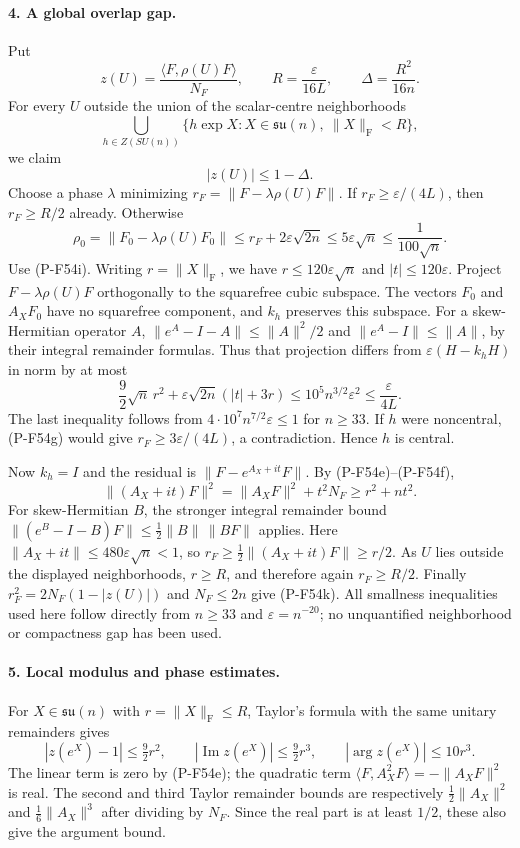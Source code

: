 \documentclass[11pt,a4paper]{article}
\begin{document}
\paragraph{4. A global overlap gap.}
Put
\[
 z(U)=\frac{\langle F,\rho(U)F\rangle}{N_F},
 \qquad R=\frac{\varepsilon}{16L},
 \qquad \Delta=\frac{R^2}{16n}.
                                                               \tag{P-F54j}
\]
For every $U$ outside the union of the scalar-centre neighborhoods
\[
  \bigcup_{h\in Z(SU(n))}
       \{h\exp X:X\in\mathfrak{su}(n),\ \|X\|_{\mathrm F}<R\},
\]
we claim
\[
                            |z(U)|\le1-\Delta.               \tag{P-F54k}
\]
Choose a phase $\lambda$ minimizing
$r_F=\|F-\lambda\rho(U)F\|$.
If $r_F\ge\varepsilon/(4L)$, then $r_F\ge R/2$ already.
Otherwise
\[
 \rho_0=\|F_0-\lambda\rho(U)F_0\|
       \le r_F+2\varepsilon\sqrt{2n}
       \le5\varepsilon\sqrt n\le\frac1{100\sqrt n}.
\]
Use (P-F54i). Writing $r=\|X\|_{\mathrm F}$, we have
$r\le120\varepsilon\sqrt n$ and $|t|\le120\varepsilon$.
Project $F-\lambda\rho(U)F$ orthogonally to the squarefree
cubic subspace. The vectors $F_0$ and $A_XF_0$ have no
squarefree component, and $k_h$ preserves this subspace.
For a skew-Hermitian operator $A$,
$\|e^A-I-A\|\le\|A\|^2/2$ and
$\|e^A-I\|\le\|A\|$, by their integral remainder formulas.
Thus that projection differs from
$\varepsilon(H-k_hH)$ in norm by at most
\[
 \frac92\sqrt n\,r^2
    +\varepsilon\sqrt{2n}(|t|+3r)
 \le10^5n^{3/2}\varepsilon^2
 \le\frac{\varepsilon}{4L}.                                 \tag{P-F54l}
\]
The last inequality follows from
$4\cdot10^7 n^{7/2}\varepsilon\le1$ for $n\ge33$.
If $h$ were noncentral, (P-F54g) would give
$r_F\ge3\varepsilon/(4L)$, a contradiction.
Hence $h$ is central.

Now $k_h=I$ and the residual is
$\|F-e^{A_X+it}F\|$.
By (P-F54e)--(P-F54f),
\[
       \|(A_X+it)F\|^2
            =\|A_XF\|^2+t^2N_F\ge r^2+nt^2.
\]
For skew-Hermitian $B$, the stronger integral remainder bound
$\|(e^B-I-B)F\|\le\frac12\|B\|\,\|BF\|$ applies.
Here $\|A_X+it\|\le480\varepsilon\sqrt n<1$, so
$r_F\ge\frac12\|(A_X+it)F\|\ge r/2$.
As $U$ lies outside the displayed neighborhoods, $r\ge R$,
and therefore again $r_F\ge R/2$.
Finally
$r_F^2=2N_F(1-|z(U)|)$ and $N_F\le2n$ give
(P-F54k). All smallness inequalities used here follow directly
from $n\ge33$ and $\varepsilon=n^{-20}$; no unquantified
neighborhood or compactness gap has been used.

\paragraph{5. Local modulus and phase estimates.}
For $X\in\mathfrak{su}(n)$ with $r=\|X\|_{\mathrm F}\le R$,
Taylor's formula with the same unitary remainders gives
\[
 |z(e^X)-1|\le\tfrac92 r^2,
 \qquad |\operatorname{Im}z(e^X)|\le\tfrac92 r^3,
 \qquad |\arg z(e^X)|\le10r^3.                               \tag{P-F54m}
\]
The linear term is zero by (P-F54e); the quadratic term
$\langle F,A_X^2F\rangle=-\|A_XF\|^2$ is real.
The second and third Taylor remainder bounds are respectively
$\frac12\|A_X\|^2$ and $\frac16\|A_X\|^3$ after dividing
by $N_F$. Since the real part is at least $1/2$, these also
give the argument bound.
\end{document}
